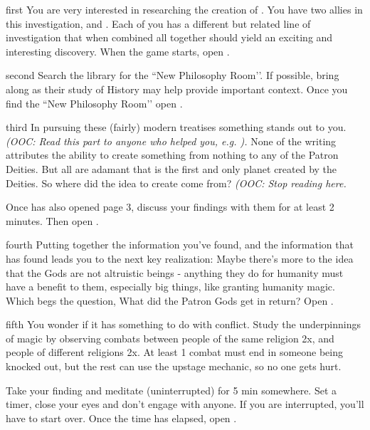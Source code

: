 \documentclass[notebook]{GL2020} %
\begin{document}
\startnotebook{\nCreationTwo{}}

\begin{page}{first}
You are very interested in researching the creation of \pEarth{}. You have two allies in this investigation, \cEbbPriest{} and \cScholarship{}. Each of you has a different but related line of investigation that when combined all together should yield an exciting and interesting discovery. When the game starts, open .
\end{page}

\begin{page}{second}
Search the library for the ``New Philosophy Room’’. If possible, bring \cHistory{} along as their study of History may help provide important context. Once you find the ``New Philosophy Room’’ open .
\end{page}

\begin{page}{third}
In pursuing these (fairly) modern treatises something stands out to you. \emph{(OOC: Read this part to anyone who helped you, e.g. \cHistory{}).} None of the writing attributes the ability to create something from nothing to any of the Patron Deities. But all are adamant that \pEarth{} is the first and only planet created by the Deities. So where did the idea to create\pEarth{} come from? \emph{(OOC: Stop reading here.}

Once \textbf{\cEbbPriest{}} has also opened page 3, discuss your findings with them for at least 2 minutes. Then open .
\end{page}

\begin{page}{fourth}
Putting together the information you’ve found, and the information that \cEbbPriest{} has found leads you to the next key realization: Maybe there’s more to the idea that  the Gods are not altruistic beings - anything they do for humanity must have a benefit to them, especially big things, like granting humanity magic. Which begs the question, What did the Patron Gods get in return? Open .
\end{page}

\begin{page}{fifth}
You wonder if it has something to do with conflict. Study the underpinnings of magic by observing combats between people of the same religion 2x, and people of different religions 2x. At least 1 combat must end in someone being knocked out, but the rest can use the upstage mechanic, so no one gets hurt.

Take your finding and meditate (uninterrupted) for 5 min somewhere. Set a timer, close your eyes and don’t engage with anyone. If you are interrupted, you’ll have to start over. Once the time has elapsed, open .
\end{page}
\end{document}
